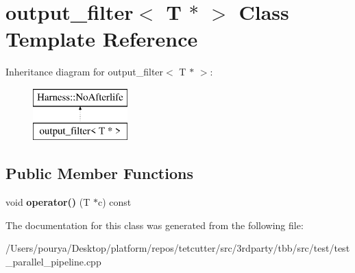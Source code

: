 \hypertarget{classoutput__filter_3_01T_01_5_01_4}{}\section{output\+\_\+filter$<$ T $\ast$ $>$ Class Template Reference}
\label{classoutput__filter_3_01T_01_5_01_4}
Inheritance diagram for output\+\_\+filter$<$ T $\ast$ $>$\+:\begin{figure}[H]
\begin{center}
\leavevmode
\includegraphics[height=2.000000cm]{classoutput__filter_3_01T_01_5_01_4}
\end{center}
\end{figure}
\subsection*{Public Member Functions}
\begin{DoxyCompactItemize}
\item 
\hypertarget{classoutput__filter_3_01T_01_5_01_4_a029d977e365c4dfc4600adc815180d53}{}void {\bfseries operator()} (T $\ast$c) const \label{classoutput__filter_3_01T_01_5_01_4_a029d977e365c4dfc4600adc815180d53}

\end{DoxyCompactItemize}


The documentation for this class was generated from the following file\+:\begin{DoxyCompactItemize}
\item 
/\+Users/pourya/\+Desktop/platform/repos/tetcutter/src/3rdparty/tbb/src/test/test\+\_\+parallel\+\_\+pipeline.\+cpp\end{DoxyCompactItemize}

